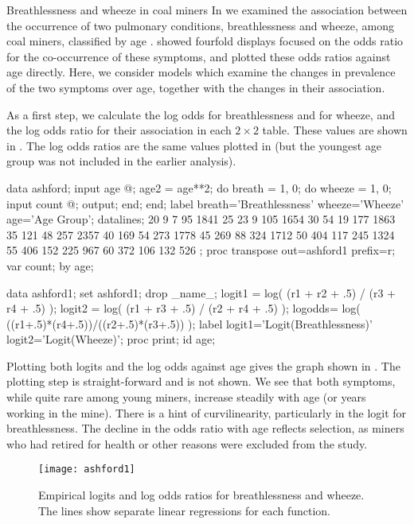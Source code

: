\begin{Example}[ashford]{Breathlessness and wheeze in coal miners}
In  we examined the association between the occurrence
of two pulmonary conditions, breathlessness and wheeze,
among coal miners, classified by age \citep{AshfordSnowden:70}.
 showed fourfold displays focused on the odds ratio
for the co-occurrence of these symptoms,
and  plotted these odds ratios against age directly.
Here, we consider models which examine the changes in prevalence of
the two symptoms over age, together with the changes in their association.

As a first step, we calculate the log odds for breathlessness and for
wheeze, and the log odds ratio for their association
in each $2 \times 2$ table. These values are shown in .
The log odds ratios are the same values plotted in 
(but the youngest age group was not included in the earlier analysis).
\begin{listing}
data ashford;
   input age @;
   age2 = age**2;
   do breath = 1, 0;
      do wheeze = 1, 0;
         input count @;
         output;
         end;
      end;
   label breath='Breathlessness'
      wheeze='Wheeze'
      age='Age Group';
datalines;
20     9    7      95 1841
25    23    9     105 1654
30    54   19     177 1863
35   121   48     257 2357
40   169   54     273 1778
45   269   88     324 1712
50   404  117     245 1324
55   406  152     225  967
60   372  106     132  526
;
proc transpose out=ashford1 prefix=r;
   var count;
   by age;

data ashford1;
   set ashford1;
   drop _name_;
   logit1 = log( (r1 + r2 + .5) / (r3 + r4 + .5) );
   logit2 = log( (r1 + r3 + .5) / (r2 + r4 + .5) );
   logodds= log( ((r1+.5)*(r4+.5))/((r2+.5)*(r3+.5)) );
   label logit1='Logit(Breathlessness)'
      logit2='Logit(Wheeze)';
proc print;  id age;
\end{listing}

\begin{Output}[htb]
\caption{Empirical logits and log odds ratios for breathlessness and wheeze}\label{out:ashford.1}
\small

\end{Output}

Plotting both logits and the log odds against age gives the graph shown
in .
The plotting step is straight-forward and is not shown.
We see that both symptoms, while quite rare among young miners, increase
steadily with age (or years working in the mine).
There is a hint of curvilinearity, particularly in the logit for
breathlessness.
The decline in the odds ratio with age reflects selection, as miners
who had retired for health or other reasons were excluded from the
study.
\begin{figure}[htb]
  \centering
  \texttt{[image: ashford1]}
  \caption[Empirical logits and log odds ratios for breathlessness and wheeze]{Empirical logits and log odds ratios for breathlessness and wheeze.
  The lines show separate linear regressions for each function.}%
  \label{fig:ashford1}
\end{figure}


\end{Example}
